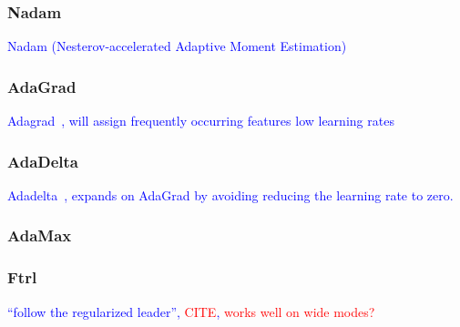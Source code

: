 
\subsubsection{Nadam}

\textcolor{blue}{Nadam (Nesterov-accelerated Adaptive Moment Estimation)~\cite{dozat2016incorporating}}

\subsubsection{AdaGrad}

\textcolor{blue}{Adagrad~\cite{duchi2011adaptive}, will assign frequently occurring features low learning rates}

\subsubsection{AdaDelta}

\textcolor{blue}{Adadelta~\cite{zeiler2012adadelta}, expands on AdaGrad by avoiding reducing the learning rate to zero.}

\subsubsection{AdaMax}

\subsubsection{Ftrl}

\textcolor{blue}{``follow the regularized leader'', \textcolor{red}{CITE}, \textcolor{red}{works well on wide modes?}}





